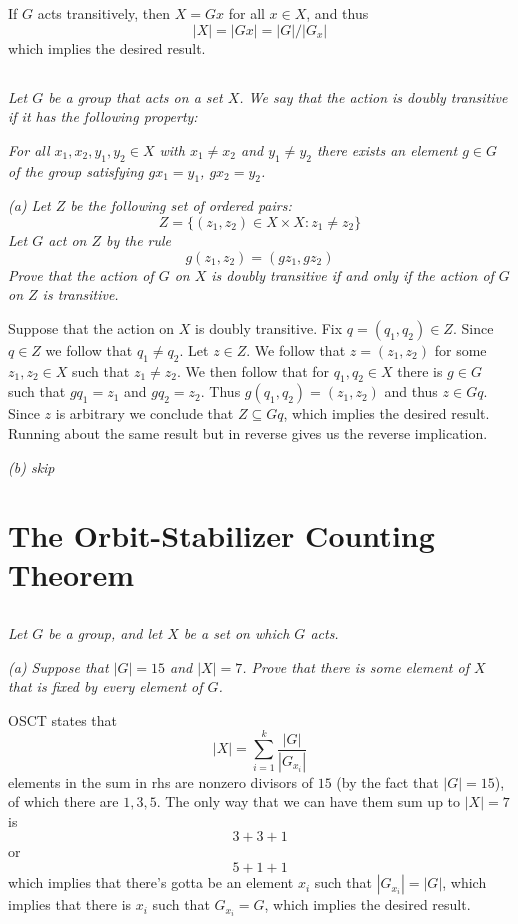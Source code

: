 \documentclass[11pt,oneside,titlepage]{book}
\newcommand{\set}[1]{\{ #1 \}}
\begin{document}
If $G$ acts transitively, then $X = Gx$ for all $x \in X$, and thus
$$|X| = |Gx| = |G| / |G_x|$$
which implies the desired result.

\subsection{}

\textit{Let $G$ be a group that acts on a set $X$. We say that the
  action is doubly transitive if it has the following property: }

\textit{For all $x_1, x_2, y_1, y_2 \in X$ with $x_1 \neq x_2$ and
  $y_1 \neq y_2$ there exists an element $g \in G$ of the group
  satisfying $g x_1 = y_1$, $g x_2 = y_2$. }


\textit{(a) Let $Z$ be the following set of ordered pairs:
  $$Z = \set{(z_1, z_2) \in X \times X: z_1 \neq z_2}$$
  Let $G$ act on $Z$ by the rule
  $$g(z_1, z_2) = (gz_1, gz_2)$$
  Prove that the action of $G$ on $X$ is doubly transitive if and only
  if the action of $G$ on $Z$ is transitive.
}

Suppose that the action on $X$ is doubly transitive. Fix $q = (q_1,
q_2) \in Z$. Since $q \in Z$ we follow that $q_1 \neq q_2$.  Let $z
\in Z$. We follow that $z = (z_1, z_2)$ for some $z_1, z_2 \in X$ such
that $z_1 \neq z_2$. We then follow that for $q_1, q_2 \in X$ there is
$g \in G$ such that $gq_1 = z_1$ and $gq_2 = z_2$.  Thus
$g(q_1, q_2) = (z_1, z_2)$ and thus $z \in Gq$. Since $z$ is arbitrary
we conclude that $Z \subseteq Gq$, which implies the desired result.
Running about the same result but in reverse gives us the reverse
implication.

\textit{(b) skip}

\section{The Orbit-Stabilizer Counting Theorem}

\subsection{}

\textit{Let $G$ be a group, and let $X$ be a set on which $G$ acts.}

\textit{(a) Suppose that $|G| = 15$ and $|X| = 7$. Prove that there is
  some element of $X$ that is fixed by every element of $G$.}

OSCT states that
$$|X| = \sum_{i = 1}^{k}{\frac{|G|}{|G_{x_i}|}}$$
elements in the sum in rhs are nonzero divisors of $15$ (by the fact
that $|G| = 15$), of which there are $1, 3, 5$. The only way that we
can have them sum up to $|X| = 7$ is
$$3 + 3 + 1$$
or
$$5 + 1 + 1$$
which implies that there's gotta be an element $x_i$ such that
$|G_{x_i}| = |G|$, which implies that there is $x_i$ such that
$G_{x_i} = G$, which implies the desired result.
\end{document}
